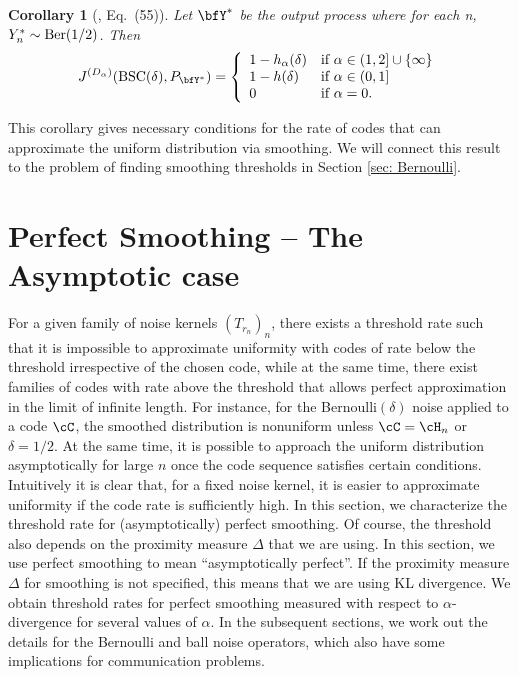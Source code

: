 \documentclass{amsart}
\newtheorem{corollary}[theorem]{Corollary}
\theoremstyle{remark}
\begin{document}
\begin{corollary}[\cite{yu2018renyi},  Eq.~(55)]\label{cor: Renyi resolvability in BSC}
Let $\bfY^{\ast}$ be the output process where for each n, ${Y}_{n}^{\ast}\sim {\text{\rm Ber}}(1/2)$. Then
    \begin{align*}
        J^{(D_\alpha)}  ({\text{\rm BSC}}(\delta),P_{\bfY^{\ast}}) =
        \left\{
	\begin{array}{lll}
		1-h_{\alpha} (\delta) & \mbox{if } \alpha \in (1,2] \cup \{\infty\} \\
		1-h(\delta) & \mbox{if } \alpha \in (0,1]\\
            0 & \mbox{if } \alpha =  0.
	\end{array}
\right.
    \end{align*}
\end{corollary}
This corollary gives necessary conditions for the rate of codes that can approximate the 
uniform distribution via smoothing. We will connect this result to the problem of finding smoothing thresholds in {Section \ref{sec: Bernoulli}}.


\section{Perfect Smoothing -- The Asymptotic case}\label{sec: Perfect Smoothing Asymptotic}
For a given family of noise kernels $(T_{r_n})_n$, there exists a threshold rate such that it is impossible to approximate uniformity with codes of rate below the threshold irrespective of the chosen code, while at the same time, there exist families of codes 
with rate above the threshold that allows perfect approximation in the limit of infinite length. 
For instance, for the Bernoulli$(\delta)$ noise applied to a code $\cC$, the smoothed distribution is nonuniform unless $\cC=\cH_n$ or $\delta=1/2$. At the same time, it is possible to approach the uniform distribution asymptotically for large $n$ once the code sequence satisfies certain conditions. Intuitively it is clear that, for a fixed noise kernel, it is easier to approximate
uniformity if the code rate is sufficiently high. In this section, we characterize the threshold rate for (asymptotically) perfect
smoothing.  Of course, the threshold also depends on the proximity measure $\Delta$ that we are using. In this section, we use perfect smoothing to mean ``asymptotically perfect''. If the proximity measure $\Delta$ for smoothing is not specified, this means that we are using KL divergence.  We obtain threshold rates for perfect smoothing measured with respect to $\alpha$-divergence for several values of $\alpha$. In the subsequent sections, we work out the details for the Bernoulli and ball noise operators, which also have some implications for
communication problems.
\end{document}
